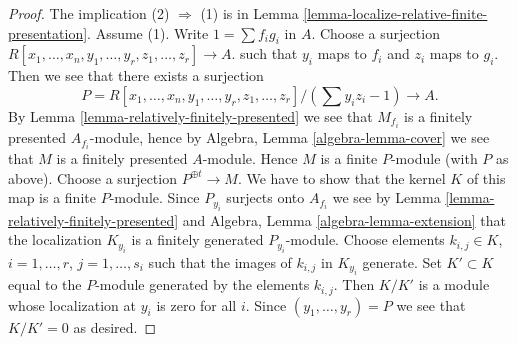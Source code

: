 \documentclass[10pt,a4paper]{amsart}
\theoremstyle{plain}
\theoremstyle{definition}
\theoremstyle{remark}
\numberwithin{equation}{subsection}
\begin{document}
\begin{proof}
The implication (2) $\Rightarrow$ (1) is in
Lemma \ref{lemma-localize-relative-finite-presentation}.
Assume (1). Write $1 = \sum f_ig_i$ in $A$.
Choose a surjection
$R[x_1, \ldots, x_n, y_1, \ldots, y_r, z_1, \ldots, z_r] \to A$.
such that $y_i$ maps to $f_i$ and $z_i$ maps to $g_i$. Then we
see that there exists a surjection
$$
P = R[x_1, \ldots, x_n, y_1, \ldots, y_r, z_1, \ldots, z_r]/(\sum y_iz_i - 1)
\longrightarrow
A.
$$
By
Lemma \ref{lemma-relatively-finitely-presented}
we see that $M_{f_i}$ is a finitely presented $A_{f_i}$-module, hence by
Algebra, Lemma \ref{algebra-lemma-cover}
we see that $M$ is a finitely presented $A$-module.
Hence $M$ is a finite $P$-module (with $P$ as above).
Choose a surjection $P^{\oplus t} \to M$.
We have to show that the kernel $K$ of this map is a finite
$P$-module. Since $P_{y_i}$ surjects onto
$A_{f_i}$ we see by
Lemma \ref{lemma-relatively-finitely-presented}
and
Algebra, Lemma \ref{algebra-lemma-extension}
that the localization $K_{y_i}$ is a finitely generated
$P_{y_i}$-module. Choose elements
$k_{i, j} \in K$, $i = 1, \ldots, r$, $j = 1, \ldots, s_i$ such
that the images of $k_{i, j}$ in $K_{y_i}$ generate.
Set $K' \subset K$ equal to the $P$-module
generated by the elements $k_{i, j}$. Then $K/K'$ is a module
whose localization at $y_i$ is zero for all $i$. Since $(y_1, \ldots, y_r) = P$
we see that $K/K' = 0$ as desired.
\end{proof}
\end{document}
